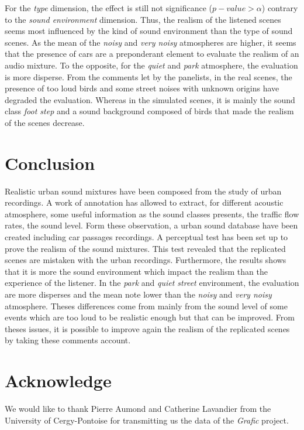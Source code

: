 \documentclass[a4,11pt,twocolumn]{article}
\begin{document}
For the \textit{type} dimension, the effect is still not significance ($p-value > \alpha$) contrary to the \textit{sound environment} dimension. Thus, the realism of the listened scenes seems most influenced by the kind of sound environment than the type of sound scenes. As the mean of the \textit{noisy} and \textit{very noisy} atmospheres are higher, it seems that the presence of cars are a preponderant element to evaluate the realism of an audio mixture. To the opposite, for the \textit{quiet} and \textit{park} atmosphere, the evaluation is more disperse. From the comments let by the panelists, in the real scenes, the presence of too loud birds and some street noises with unknown origins have degraded the evaluation. Whereas in the simulated scenes, it is mainly the sound class \textit{foot step} and a sound background composed of birds that made the realism of the scenes decrease. \\

\section*{Conclusion}
Realistic urban sound mixtures have been composed from the study of urban recordings. A work of annotation has allowed to extract, for different acoustic atmosphere, some useful information as the sound classes presents, the traffic flow rates, the sound level. Form these observation, a urban sound database have been created including car passages recordings. A perceptual test has been set up to prove the realism of the sound mixtures. This test revealed that the replicated scenes are mistaken with the urban recordings. Furthermore, the results shows that it is more the sound environment which impact the realism than the experience of the listener. In the \textit{park} and \textit{quiet street} environment, the evaluation are more disperses and the mean note lower than the \textit{noisy} and \textit{very noisy} atmosphere. Theses differences come from mainly from the sound level of some events which are too loud to be realistic enough but that can be improved. From theses issues, it is possible to improve again the realism  of the replicated scenes by taking these comments account.

\section*{Acknowledge}
We would like to thank Pierre Aumond and Catherine Lavandier from the University of Cergy-Pontoise for transmitting us the data of the \textit{Grafic} project.



\end{document}

